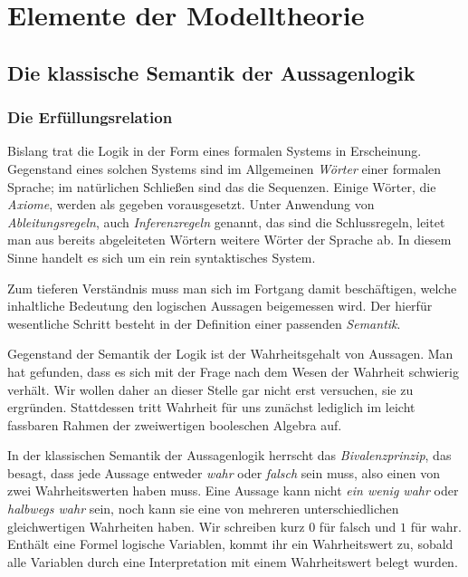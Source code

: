 
\chapter{Elemente der Modelltheorie}

\section{Die klassische Semantik der Aussagenlogik}

\subsection{Die Erfüllungsrelation}

Bislang trat die Logik in der Form eines formalen Systems in
Erscheinung. Gegenstand eines solchen Systems sind im Allgemeinen
\emph{Wörter} einer formalen Sprache; im natürlichen Schließen sind das
die Sequenzen. Einige Wörter, die \emph{Axiome}, werden als gegeben
vorausgesetzt. Unter Anwendung von \emph{Ableitungsregeln}, auch
\emph{Inferenzregeln} genannt, das sind die Schlussregeln, leitet man
aus bereits abgeleiteten Wörtern weitere Wörter der Sprache ab.
In diesem Sinne handelt es sich um ein rein syntaktisches System.

Zum tieferen Verständnis muss man sich im Fortgang damit beschäftigen,
welche inhaltliche Bedeutung den logischen Aussagen beigemessen
wird. Der hierfür wesentliche Schritt besteht in der Definition
einer passenden \emph{Semantik}.

Gegenstand der Semantik der Logik ist der Wahrheitsgehalt von Aussagen.
Man hat gefunden, dass es sich mit der Frage nach dem Wesen der Wahrheit
schwierig verhält. Wir wollen daher an dieser Stelle gar nicht erst
versuchen, sie zu ergründen. Stattdessen tritt Wahrheit für uns zunächst
lediglich im leicht fassbaren Rahmen der zweiwertigen booleschen
Algebra auf.

In der klassischen Semantik der Aussagenlogik herrscht das
\emph{Bivalenzprinzip}, das besagt, dass jede
Aussage entweder \emph{wahr} oder \emph{falsch} sein muss, also einen
von zwei Wahrheitswerten haben muss. Eine Aussage kann nicht
\emph{ein wenig wahr} oder \emph{halbwegs wahr} sein, noch kann sie
eine von mehreren unterschiedlichen gleichwertigen Wahrheiten haben.
Wir schreiben kurz $0$ für falsch und $1$ für wahr. Enthält eine Formel
logische Variablen, kommt ihr ein Wahrheitswert zu, sobald alle
Variablen durch eine Interpretation mit
einem Wahrheitswert belegt wurden.

